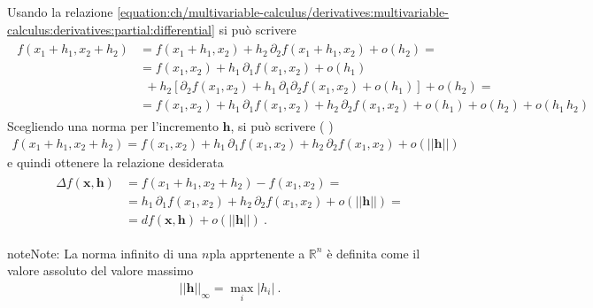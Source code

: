 \documentclass[letterpaper,10pt,english]{jupyterBook}
\begin{document}
\sphinxAtStartPar
Usando la relazione \eqref{equation:ch/multivariable-calculus/derivatives:multivariable-calculus:derivatives:partial:differential} si può scrivere
\begin{equation*}
\begin{split}\begin{aligned}
f(x_1 + h_1, x_2 + h_2)
  & = f(x_1 + h_1, x_2 ) + h_2 \, \partial_{2} f(x_1 + h_1, x_2) + o(h_2) = \\
  & = f(x_1, x_2) + h_1 \, \partial_{1} f(x_1, x_2) + o(h_1) \\
  & \ \ + h_2 \left[ \partial_{2} f(x_1, x_2) + h_1 \, \partial_{1}\partial_{2} f(x_1, x_2) + o (h_1) \right] + o(h_2) = \\
  & = f(x_1, x_2) + h_1 \, \partial_{1} f(x_1, x_2) + h_2 \, \partial_{2} f(x_1, x_2) + o(h_1) + o(h_2) + o(h_1 \, h_2) 
\end{aligned}\end{split}
\end{equation*}
\sphinxAtStartPar
Scegliendo una norma per l’incremento \(\mathbf{h}\), si può scrivere ( )
\begin{equation*}
\begin{split}
f(x_1 + h_1, x_2 + h_2) = f(x_1, x_2) + h_1 \, \partial_{1} f(x_1, x_2) + h_2 \, \partial_{2} f(x_1, x_2) + o(||\mathbf{h}||)
\end{split}
\end{equation*}
\sphinxAtStartPar
e quindi ottenere la relazione desiderata
\begin{equation*}
\begin{split}\begin{aligned}
\Delta f(\mathbf{x}, \mathbf{h}) & = f(x_1 + h_1, x_2 + h_2) - f(x_1, x_2) = \\
                                 & = h_1 \, \partial_{1} f(x_1, x_2) + h_2 \, \partial_{2} f(x_1, x_2) + o(||\mathbf{h}||) = \\
                                 & = d f(\mathbf{x}, \mathbf{h}) + o(||\mathbf{h}||) \ .
\end{aligned}\end{split}
\end{equation*}
\begin{sphinxadmonition}{note}{Note:}
\sphinxAtStartPar
{}
La norma infinito di una \(n\)\sphinxhyphen{}pla apprtenente a \(\mathbb{R}^n\) è definita come il valore assoluto del valore massimo
\begin{equation*}
\begin{split}||\mathbf{h}||_{\infty} = \max_i |h_i| \ .\end{split}
\end{equation*}\end{sphinxadmonition}
\end{document}
